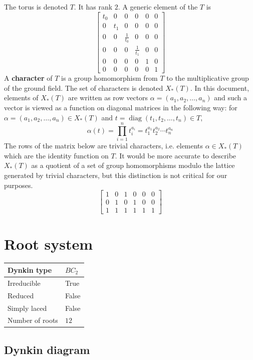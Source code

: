 \documentclass[11pt]{article}
\newcommand{\tbf}{\textbf}
\DeclareMathOperator{\diag}{diag}
\theoremstyle{definition}
\begin{document}
The torus is denoted $T$. It has rank $2$. A generic element of the $T$ is
\[
\left[\begin{matrix}t_{0} & 0 & 0 & 0 & 0 & 0\\0 & t_{1} & 0 & 0 & 0 & 0\\0 & 0 & \frac{1}{t_{0}} & 0 & 0 & 0\\0 & 0 & 0 & \frac{1}{t_{1}} & 0 & 0\\0 & 0 & 0 & 0 & 1 & 0\\0 & 0 & 0 & 0 & 0 & 1\end{matrix}\right]
\]
A \tbf{character} of $T$ is a group homomorphism from $T$ to the multiplicative group of the ground field. The set of characters is denoted $X_*(T)$. In this document, elements of $X_*(T)$ are written as row vectors $\alpha = (a_1, a_2, \ldots, a_n)$ and such a vector is viewed as a function on diagonal matrices in the following way: for $\alpha = (a_1, a_2, \ldots, a_n) \in X_*(T)$ and $t = \diag(t_1, t_2, \ldots, t_n) \in T$, 
\[
	\alpha(t) = \prod_{i=1}^n t_i^{a_i} = t_1^{a_1} t_2^{a_2} \cdots t_n^{a_n}
\]
The rows of the matrix below are trivial characters, i.e. elements $\alpha \in X_*(T)$ which are the identity function on $T$. It would be more accurate to describe $X_*(T)$ as a quotient of a set of group homomorphisms modulo the lattice generated by trivial characters, but this distinction is not critical for our purposes.
\[
\left[\begin{matrix}1 & 0 & 1 & 0 & 0 & 0\\0 & 1 & 0 & 1 & 0 & 0\\1 & 1 & 1 & 1 & 1 & 1\end{matrix}\right]
\]

\newpage
\section{Root system}

\begin{tabular}{|l|l|}
	\hline
    Dynkin type & $BC_2$ \\
	\hline
    Irreducible & True \\
	\hline
    Reduced & False \\
	\hline
	Simply laced & False \\
	\hline
	Number of roots & $12$ \\
	\hline
\end{tabular}

\subsection{Dynkin diagram}
\end{document}
